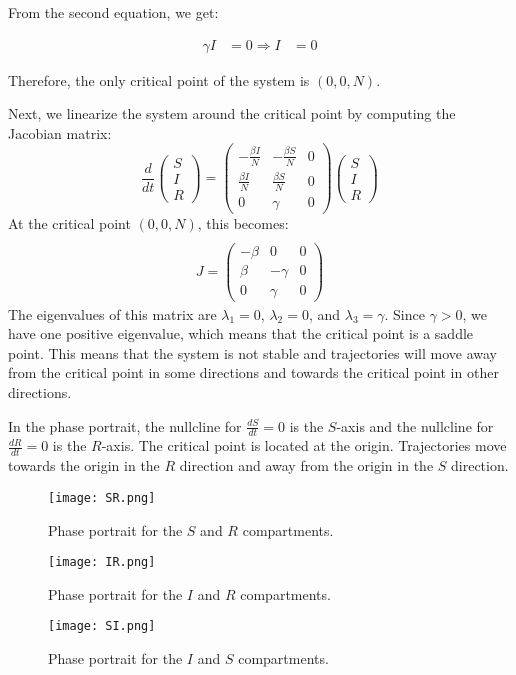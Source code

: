 \documentclass{article}
\begin{document}
\begin{enumerate}
From the second equation, we get:

\begin{align}
\gamma I &= 0
\Rightarrow I &= 0
\end{align}

Therefore, the only critical point of the system is $(0, 0, N)$.

Next, we linearize the system around the critical point by computing the Jacobian matrix:
$$
\frac{d}{d t}\left(\begin{array}{l}
S \\
I \\
R
\end{array}\right)=\left(\begin{array}{ccc}
-\frac{\beta I}{N} & -\frac{\beta S}{N} & 0 \\
\frac{\beta I}{N} & \frac{\beta S}{N} & 0 \\
0 & \gamma & 0
\end{array}\right)\left(\begin{array}{l}
S \\
I \\
R
\end{array}\right)
$$
At the critical point $(0,0,N)$, this becomes:$$
\begin{gathered}\\
J=\left(\begin{array}{ccc}
-\beta & 0 & 0 \\
\beta & -\gamma & 0 \\
0 & \gamma & 0
\end{array}\right)
\end{gathered}
$$
The eigenvalues of this matrix are $\lambda_1 = 0$, $\lambda_2 = 0$, and $\lambda_3 = \gamma$. Since $\gamma > 0$, we have one positive eigenvalue, which means that the critical point is a saddle point. This means that the system is not stable and trajectories will move away from the critical point in some directions and towards the critical point in other directions.

In the phase portrait, the nullcline for $\frac{dS}{dt} = 0$ is the $S$-axis and the nullcline for $\frac{dR}{dt} = 0$ is the $R$-axis. The critical point is located at the origin. Trajectories move towards the origin in the $R$ direction and away from the origin in the $S$ direction.

\end{enumerate}
\begin{figure}[htbp]
\centering
\begin{minipage}[b]{0.45\textwidth}
\texttt{[image: SR.png]}
\caption{Phase portrait for the $S$ and $R$ compartments.}
\end{minipage}
\hfill
\begin{minipage}[b]{0.45\textwidth}
\texttt{[image: IR.png]}
\caption{Phase portrait for the $I$ and $R$ compartments.}
\end{minipage}
\hfill
\begin{minipage}[b]{0.55\textwidth}
\texttt{[image: SI.png]}
\caption{Phase portrait for the $I$ and $S$ compartments.}
\end{minipage}
\end{figure}
\end{document}
